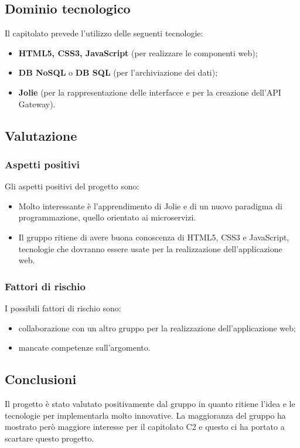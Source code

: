 	\subsection {Dominio tecnologico}
		Il capitolato prevede l'utilizzo delle seguenti tecnologie:
		\begin {itemize}
			\item \textbf{HTML5, CSS3, JavaScript} (per realizzare le componenti web);
			\item \textbf{DB NoSQL} o \textbf{DB SQL} (per l'archiviazione dei dati);
			\item \textbf{Jolie} (per la rappresentazione delle interfacce e per la creazione dell'API Gateway).
		\end {itemize}
	\subsection {Valutazione}
		\subsubsection {Aspetti positivi}
		Gli aspetti positivi del progetto sono:
			\begin{itemize}
				\item Molto interessante è l'apprendimento di Jolie e di un nuovo paradigma di programmazione, quello orientato ai microservizi.
				\item Il gruppo ritiene di avere buona conoscenza di HTML5, CSS3 e JavaScript, tecnologie che dovranno essere usate per la realizzazione dell'applicazione web.
			\end{itemize}
		\subsubsection {Fattori di rischio}
		I possibili fattori di rischio sono:
			\begin{itemize}
				\item collaborazione con un altro gruppo per la realizzazione dell'applicazione web;
				\item mancate competenze sull'argomento.
			\end{itemize}
	\subsection {Conclusioni}
		Il progetto è stato valutato positivamente dal gruppo in quanto ritiene l'idea e le tecnologie per implementarla molto innovative. La maggioranza del gruppo ha mostrato però maggiore interesse
		per il capitolato C2 e questo ci ha portato a scartare questo progetto.